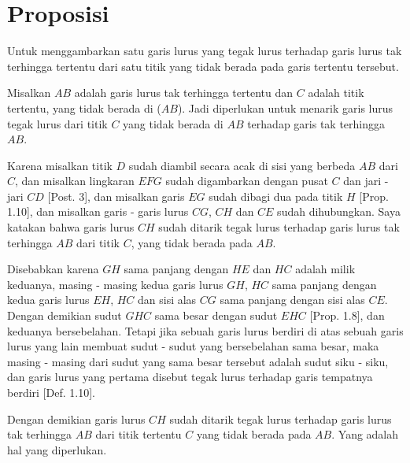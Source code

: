 \documentclass[a4paper]{book}
\begin{document}
\section*{\centering Proposisi \thesection} 
Untuk menggambarkan satu garis lurus yang tegak lurus terhadap garis
lurus tak terhingga tertentu dari satu titik yang tidak berada pada
garis tertentu tersebut.  
\begin{center}
\end{center} 
Misalkan $AB$ adalah garis lurus tak terhingga tertentu dan $C$ adalah titik 
tertentu, yang tidak berada di ($AB$). Jadi diperlukan untuk menarik garis lurus
tegak lurus dari titik $C$ yang tidak berada di $AB$ terhadap garis tak 
terhingga $AB$.

Karena misalkan titik $D$ sudah diambil secara acak di sisi yang berbeda $AB$ dari
$C$, dan misalkan lingkaran $EFG$ sudah digambarkan dengan pusat $C$ dan 
jari - jari $CD$ [Post. 3], dan misalkan garis $EG$ sudah dibagi dua pada
titik $H$ [Prop. 1.10], dan misalkan garis - garis lurus $CG$, $CH$ dan $CE$
sudah dihubungkan. Saya katakan bahwa garis lurus $CH$ sudah ditarik tegak 
lurus terhadap garis lurus tak terhingga $AB$ dari titik $C$, yang tidak 
berada pada $AB$. 

Disebabkan karena $GH$ sama panjang dengan $HE$ dan $HC$ adalah milik keduanya, 
masing - masing kedua garis lurus $GH$, $HC$ sama panjang dengan kedua garis 
lurus  $EH$, $HC$ dan sisi alas $CG$ sama panjang dengan sisi alas $CE$. 
Dengan demikian sudut $GHC$ sama besar dengan sudut $EHC$ [Prop. 1.8], dan 
keduanya  bersebelahan. Tetapi jika sebuah garis lurus berdiri di atas
sebuah garis lurus yang lain membuat sudut - sudut yang bersebelahan 
sama besar, maka masing - masing dari sudut yang sama besar tersebut adalah
sudut siku - siku, dan garis lurus yang pertama disebut tegak lurus terhadap
garis tempatnya berdiri [Def. 1.10].

Dengan demikian garis lurus $CH$ sudah ditarik tegak lurus terhadap garis
lurus tak terhingga $AB$ dari titik tertentu $C$ yang tidak berada pada
$AB$. Yang adalah hal yang diperlukan.
\end{document}
